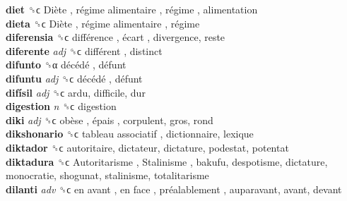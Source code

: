\textbf{diet} ␝ϲ   Diète ,  régime alimentaire ,  régime , alimentation  \\
\textbf{dieta} ␝ϲ   Diète ,  régime alimentaire ,  régime   \\
\textbf{diferensia} ␝ϲ   différence ,  écart , divergence, reste  \\
\textbf{diferente} \emph{adj}  ␝ϲ   différent , distinct  \\
\textbf{difunto} ␝α   décédé ,  défunt   \\
\textbf{difuntu} \emph{adj}  ␝ϲ   décédé ,  défunt   \\
\textbf{difísil} \emph{adj}  ␝ϲ  ardu, difficile, dur  \\
\textbf{digestion} \emph{n}  ␝ϲ  digestion  \\
\textbf{diki} \emph{adj}  ␝ϲ   obèse ,  épais , corpulent, gros, rond  \\
\textbf{dikshonario} ␝ϲ   tableau associatif , dictionnaire, lexique  \\
\textbf{diktador} ␝ϲ  autoritaire, dictateur, dictature, podestat, potentat  \\
\textbf{diktadura} ␝ϲ   Autoritarisme ,  Stalinisme , bakufu, despotisme, dictature, monocratie, shogunat, stalinisme, totalitarisme  \\
\textbf{dilanti} \emph{adv}  ␝ϲ   en avant ,  en face ,  préalablement , auparavant, avant, devant  \\
